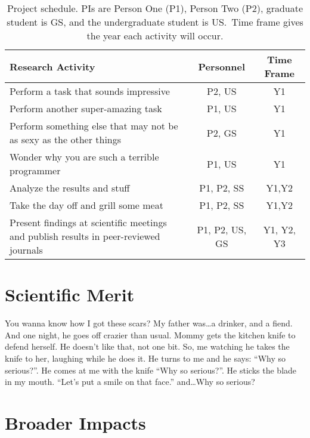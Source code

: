 \begin{table}[H]
\label{table1}
\renewcommand{\arraystretch}{0}
\caption{Project schedule.  PIs are Person One (P1), Person Two (P2), graduate student is GS, and the undergraduate student is US.\ Time frame gives the year each activity will occur.}
\scriptsize
\begin{tabularx}{\textwidth}{Y c c }
\hline
\hline
\textbf{Research Activity} & \textbf{Personnel} & \textbf{Time Frame}\\
\hline
Perform a task that sounds impressive & P2, US & Y1 \T\\
Perform another super-amazing task & P1, US & Y1 \T\\
Perform something else that may not be as sexy as the other things & P2, GS & Y1 \T\\
Wonder why you are such a terrible programmer & P1, US & Y1 \T\\
Analyze the results and stuff & P1, P2, SS & Y1,Y2 \T\\
Take the day off and grill some meat & P1, P2, SS & Y1,Y2 \T\\
Present findings at scientific meetings and publish results in peer-reviewed journals & P1, P2, US, GS & Y1, Y2, Y3\T\B\\
\hline
\hline
\end{tabularx}
\end{table}

\section{Scientific Merit}

You wanna know how I got these scars? My father was\ldots a drinker, and a fiend. And one night, he goes off crazier than usual. Mommy gets the kitchen knife to defend herself. He doesn't like that, not one bit. So, me watching he takes the knife to her, laughing while he does it. He turns to me and he says: ``Why so serious?''. He comes at me with the knife ``Why so serious?''. He sticks the blade in my mouth. ``Let's put a smile on that face.'' and\ldots Why so serious?


\section{Broader Impacts}
\label{broadimpacts}
\vspace*{-8pt}

